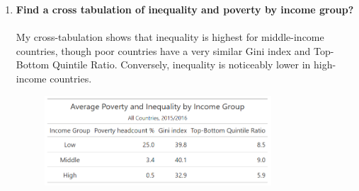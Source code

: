 \documentclass[12pt]{article}
\begin{document}
\begin{enumerate}
\begin{enumerate}
        \item \textbf{Find a cross tabulation of inequality and poverty by income group?}
        \\\\
        My cross-tabulation shows that inequality is highest for middle-income countries, though poor countries have a very similar Gini index and Top-Bottom Quintile Ratio. Conversely, inequality is noticeably lower in high-income countries.
        \begin{figure}[H]
            \centering
            \includegraphics[width=0.8\textwidth]{./output/inequality_poverty_table.png}
        \end{figure}


\end{enumerate}
\end{enumerate}
\end{document}
